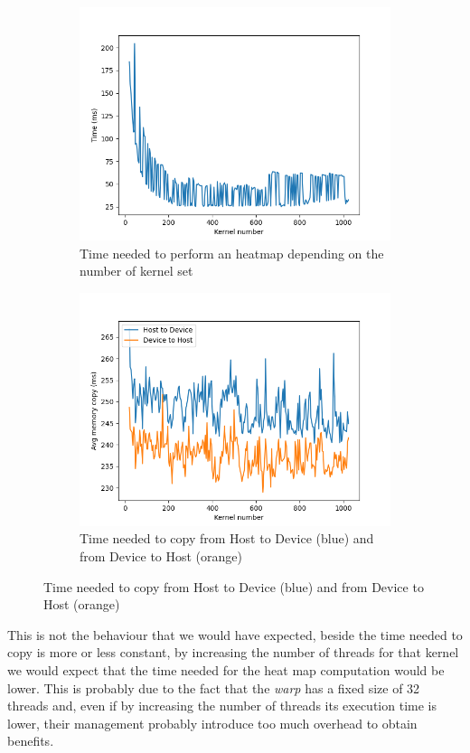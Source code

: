 \documentclass[paper=a4, fontsize=10pt]{scrartcl}	%
\begin{document}
	\begin{figure}[H]
		\centering
		\begin{subfigure}{.45\textwidth}
			\centering
			\includegraphics[width=.8\linewidth]{images/heatmap/plot_kernel_times.png}
			\caption{Time needed to perform an heatmap depending on the number of kernel set}
			\label{fig:sub1}
		\end{subfigure}%
		\hspace{5mm}
		\begin{subfigure}{.45\textwidth}
			\centering
			\includegraphics[width=.8\linewidth]{images/heatmap/hd.png}
			\caption{Time needed to copy from Host to Device (blue) and from Device to Host (orange)}
			\label{fig:sub2}
		\end{subfigure}
	\end{figure}
	This is not the behaviour that we would have expected, beside the time needed to copy is more or less constant, by increasing the number of threads for that kernel we would expect that the time needed for the heat map computation would be lower. This is probably due to the fact that the \textit{warp} has a fixed size of 32 threads and, even if by increasing the number of threads its execution time is lower, their management probably introduce too much overhead to obtain benefits.
	
\end{document}
